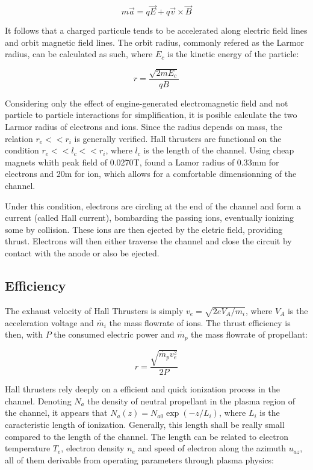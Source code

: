 \begin{equation}
\label{eq:het_newton}
    m\vec{a} = q\vec{E} + q\vec{v}\times\vec{B}
\end{equation}

It follows that a charged particule tends to be accelerated along electric field lines and orbit magnetic field lines. The orbit radius, commonly refered as the Larmor radius, can be calculated as such, where $E_c$ is the kinetic energy of the particle:

\begin{equation}
\label{eq:het_larmor}
    r = \frac{\sqrt{2mE_c}}{qB}
\end{equation}

Considering only the effect of engine-generated electromagnetic field and not particle to particle interactions for simplification, it is posible calculate the two Larmor radius of electrons and ions. Since the radius depends on mass, the relation $r_e << r_i$ is generally verified. Hall thrusters are functional on the condition $r_e << l_c << r_i$, where $l_c$ is the length of the channel. Using cheap magnets whith peak field of 0.0270T, \cite{demo_het} found a Lamor radius of 0.33mm for electrons and 20m for ion, which allows for a comfortable dimensionning of the channel.

Under this condition, electrons are circling at the end of the channel and form a current (called Hall current), bombarding the passing ions, eventually ionizing some by collision. These ions are then ejected by the eletric field, providing thrust. Electrons will then either traverse the channel and close the circuit by contact with the anode or also be ejected.

\subsection{Efficiency}

The exhaust velocity of Hall Thrusters is simply $v_e = \sqrt{2eV_A/m_i}$, where $V_A$ is the acceleration voltage and $\dot{m_i}$ the mass flowrate of ions. The thrust efficiency is then, with $P$ the consumed electric power and $\dot{m_p}$ the mass flowrate of propellant:

\begin{equation}
\label{eq:het_threff}
    r = \frac{\sqrt{\dot{m_p}v_e^2}}{2P}
\end{equation}

Hall thrusters rely deeply on a efficient and quick ionization process in the channel. Denoting $N_a$ the density of neutral propellant in the plasma region of the channel, it appears that $N_a(z) = N_{a0}\exp(-z/L_i)$, where $L_i$ is the caracteristic length of ionization. Generally, this length shall be really small compared to the length of the channel. The length can be related to electron temperature $T_e$, electron density $n_e$ and speed of electron along the azimuth $u_{az}$, all of them derivable from operating parameters through plasma physics:

